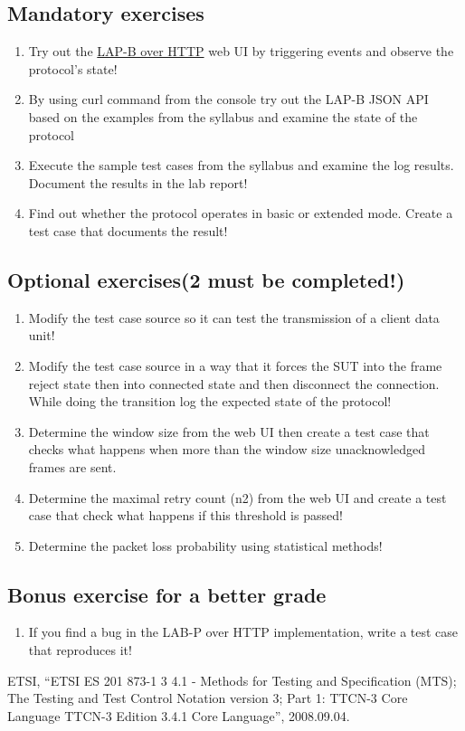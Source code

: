 \documentclass[a4paper]{article}
\begin{document}
\subsection{Mandatory exercises}
\begin{enumerate}
    \item Try out the \href{http://152.66.246.231:3000/}{LAP-B over HTTP} web UI by triggering events and observe the
          protocol's state!
    \item By using curl command from the console try out the LAP-B JSON API based on the examples from the syllabus and
          examine the state of the protocol
    \item Execute the sample test cases from the syllabus and examine the log results. Document the results in the lab
          report!
    \item Find out whether the protocol operates in basic or extended mode. Create a test case that documents the
          result!
\end{enumerate}

\subsection{Optional exercises(2 must be completed!)}
\begin{enumerate}[resume]
    \item Modify the test case source so it can test the transmission of a client data unit!
    \item Modify the test case source in a way that it forces the SUT into the frame reject state then into connected
          state and then disconnect the connection. While doing the transition log the expected state of the protocol!
    \item Determine the window size from the web UI then create a test case that checks what happens when more than the
          window size unacknowledged frames are sent.
    \item Determine the maximal retry count (n2) from the web UI and create a test case that check what happens if this
          threshold is passed!
    \item Determine the packet loss probability using statistical methods!
\end{enumerate}

\subsection{Bonus exercise for a better grade}
\begin{enumerate}[resume]
    \item If you find a bug in the LAB-P over HTTP implementation, write a test case that reproduces it!
\end{enumerate}

\begin{thebibliography}{9}

    ETSI,
    ``{ETSI} {ES} 201 873-1 3 4.1 - Methods for Testing and Specification ({MTS}); The
    Testing and Test Control Notation version 3; Part 1: {TTCN-3} Core Language {TTCN-3}
    Edition 3.4.1 Core Language'',
    2008.09.04.
\end{thebibliography}
\end{document}

